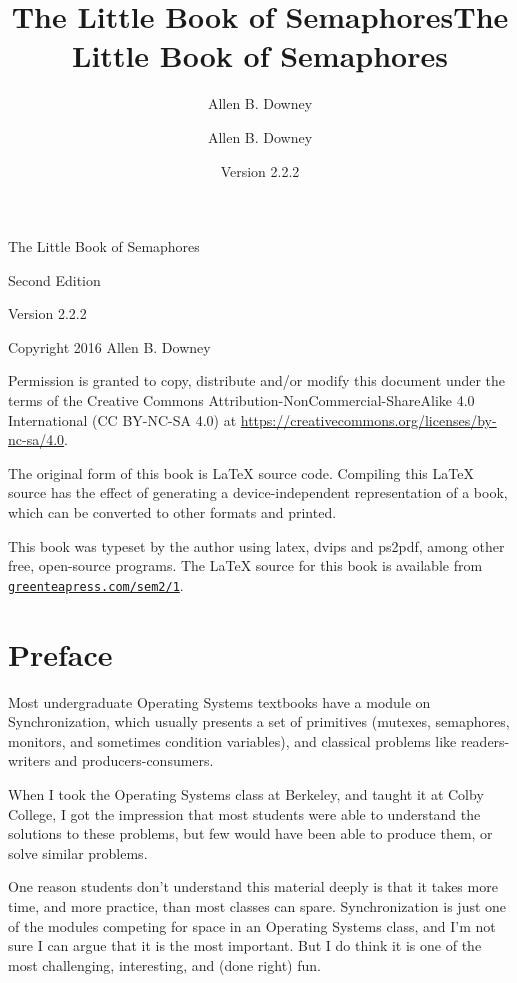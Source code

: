 \documentclass{book}
\title{The Little Book of Semaphores}
\author{Allen B. Downey}
\newcommand{\shortlink}[1]{\href{https://greenteapress.com/sem2/#1}{\nolinkurl{greenteapress.com/sem2/#1}}}
\newcommand{\theversion}{Version 2.2.2}
\begin{document}
\title {The Little Book of Semaphores}
\author {Allen B. Downey}

\date {\theversion}
\maketitle

\vspace{2in}
\begin{center}
{\Large The Little Book of Semaphores}

Second Edition
\vspace{0.25in}

\theversion
\vspace{0.25in}

Copyright 2016 Allen B. Downey
\end{center}
\vspace{0.25in}

Permission is granted to copy, distribute and/or modify this
document under the terms of the Creative Commons
Attribution-NonCommercial-ShareAlike 4.0 International (CC BY-NC-SA 4.0)
at \url{https://creativecommons.org/licenses/by-nc-sa/4.0}.

The original form of this book is LaTeX source code.
Compiling this LaTeX source has the effect of generating
a device-independent representation of a book, which
can be converted to other formats and printed.

This book was typeset by the author using latex, dvips and ps2pdf,
among other free, open-source programs.
The LaTeX source for this book is available from
\shortlink{1}.

\frontmatter

\chapter{Preface}

Most undergraduate Operating Systems textbooks have a module on
Synchronization, which usually presents a set of primitives
(mutexes, semaphores, monitors, and sometimes condition variables),
and classical problems like readers-writers and
producers-consumers.

When I took the Operating Systems class at Berkeley, and taught it at
Colby College, I got the impression that most students were able to
understand the solutions to these problems, but few would have been
able to produce them, or solve similar problems.

One reason students don't understand this material deeply is that
it takes more time, and more practice, than most classes can spare.
Synchronization is just one of the modules competing for space in
an Operating Systems class, and I'm not sure I can argue that it is
the most important.  But I do think it is one of the most challenging,
interesting, and (done right) fun.
\end{document}
